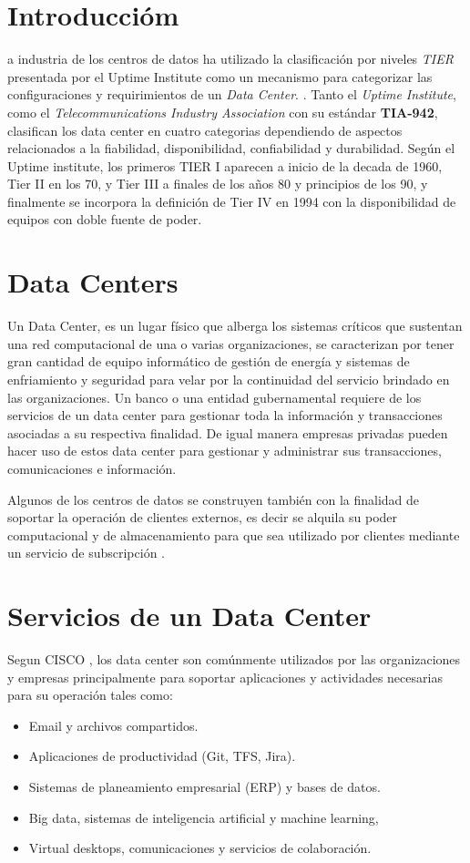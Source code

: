 \documentclass[journal]{IEEEtran}
\begin{document}
\section{Introduccióm}
a industria de los centros de datos ha utilizado la clasificación por niveles \emph{TIER} presentada
por el Uptime Institute como un mecanismo para categorizar las configuraciones y 
requirimientos de un \emph{Data Center}. \cite{arno_friedl_gross_schuerger_2012,pitt_turner}.
Tanto el \emph{Uptime Institute}, como el \emph{Telecommunications Industry Association} con su estándar \textbf{TIA-942}\cite{TIA}, clasifican los 
data center en cuatro categorias dependiendo de aspectos relacionados a la fiabilidad, disponibilidad, confiabilidad y durabilidad.
Según el Uptime institute, los primeros TIER I aparecen a inicio de la decada de 1960, Tier II en los 70, y Tier III a finales de los años 80 y principios de los 90, y finalmente
se incorpora la definición de Tier IV en 1994 con la disponibilidad de equipos con doble fuente de poder.

\section{Data Centers}
Un Data Center, es un lugar físico que alberga los sistemas críticos que sustentan una red computacional de una o varias organizaciones, se caracterizan por tener gran cantidad de equipo informático 
de gestión de energía y sistemas de enfriamiento y seguridad para velar por la continuidad del servicio brindado en las organizaciones.
Un banco o una entidad gubernamental requiere de los servicios de un data center para gestionar toda la información y transacciones asociadas a su respectiva finalidad. De igual manera empresas privadas pueden hacer
uso de estos data center para gestionar y administrar sus transacciones, comunicaciones e información.

Algunos de los centros de datos se construyen también con la finalidad de soportar la operación de clientes externos, es decir se alquila su poder computacional y de almacenamiento para que sea utilizado por
clientes mediante un servicio de subscripción \cite{amazon_2003}.

\section{Servicios de un Data Center}
Segun CISCO \cite{cisco_2020}, los data center son comúnmente utilizados por las organizaciones y empresas principalmente para soportar aplicaciones y actividades necesarias para su operación tales
como:
\begin{itemize}
  \item Email y archivos compartidos.
  \item Aplicaciones de productividad (Git, TFS, Jira).
  \item Sistemas de planeamiento empresarial (ERP) y bases de datos.
  \item Big data, sistemas de inteligencia artificial y machine learning,
  \item Virtual desktops, comunicaciones y servicios de colaboración.
\end{itemize}
\end{document}
